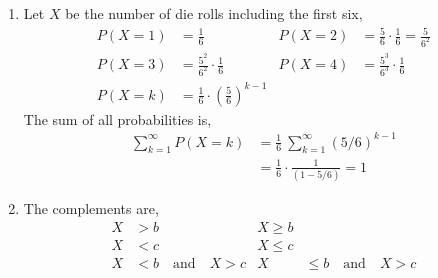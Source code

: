 \begin{enumerate}
    \item Let $ X $ be the number of die rolls including the first six,
          \begin{align}
              P(X=1) & = \frac{1}{6}                                        &
              P(X=2) & = \frac{5}{6} \cdot \frac{1}{6}
              = \frac{5}{6^2}                                                 \\
              P(X=3) & = \frac{5^2}{6^2} \cdot \frac{1}{6}                  &
              P(X=4) & = \frac{5^3}{6^3} \cdot \frac{1}{6}                    \\
              P(X=k) & = \frac{1}{6} \cdot \left( \frac{5}{6} \right)^{k-1}
          \end{align}
          The sum of all probabilities is,
          \begin{align}
              \sum_{k=1}^{\infty} P(X=k) & = \frac{1}{6}\ \sum_{k=1}^{\infty}
              (5/6)^{k-1}                                                          \\
                                         & = \frac{1}{6} \cdot \frac{1}{(1 - 5/6)}
              = 1
          \end{align}

    \item The complements are,
          \begin{align}
              X & > b                                 & X \geq b \\
              X & < c                                 & X \leq c \\
              X & < b \quad \text{and} \quad X > c    &
              X & \leq b \quad \text{and} \quad X > c
          \end{align}
\end{enumerate}